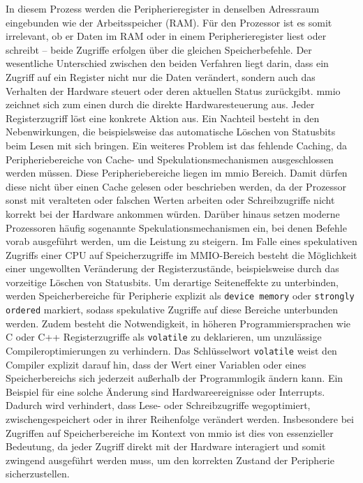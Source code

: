 In diesem Prozess werden die Peripherieregister in denselben Adressraum eingebunden wie der Arbeitsspeicher (RAM). 
Für den Prozessor ist es somit irrelevant, ob er Daten im RAM oder in einem Peripherieregister liest oder schreibt – beide Zugriffe erfolgen über die gleichen Speicherbefehle. 
Der wesentliche Unterschied zwischen den beiden Verfahren liegt darin, dass ein Zugriff auf ein Register nicht nur die Daten verändert, sondern auch das Verhalten der Hardware steuert oder deren aktuellen Status zurückgibt.
\gls{mmio} zeichnet sich zum einen durch die direkte Hardwaresteuerung aus.
Jeder Registerzugriff löst eine konkrete Aktion aus.
Ein Nachteil besteht in den Nebenwirkungen, die beispielsweise das automatische Löschen von Statusbits beim Lesen mit sich bringen.
Ein weiteres Problem ist das fehlende Caching, da Peripheriebereiche von Cache- und Spekulationsmechanismen ausgeschlossen werden müssen. 
Diese Peripheriebereiche liegen im \gls{mmio} Bereich.
Damit dürfen diese nicht über einen Cache gelesen oder beschrieben werden, da der Prozessor sonst mit veralteten oder falschen Werten arbeiten oder Schreibzugriffe nicht korrekt bei der Hardware ankommen würden.
Darüber hinaus setzen moderne Prozessoren häufig sogenannte Spekulationsmechanismen ein, bei denen Befehle vorab ausgeführt werden, um die Leistung zu steigern.
Im Falle eines spekulativen Zugriffs einer CPU auf Speicherzugriffe im MMIO-Bereich besteht die Möglichkeit einer ungewollten Veränderung der Registerzustände, beispielsweise durch das vorzeitige Löschen von Statusbits.
Um derartige Seiteneffekte zu unterbinden, werden Speicherbereiche für Peripherie explizit als \texttt{device memory} oder \texttt{strongly ordered} markiert, sodass spekulative Zugriffe auf diese Bereiche unterbunden werden.
Zudem besteht die Notwendigkeit, in höheren Programmiersprachen wie C oder C++ Registerzugriffe als \texttt{volatile} zu deklarieren, um unzulässige Compileroptimierungen zu verhindern.
Das Schlüsselwort \texttt{volatile} weist den Compiler explizit darauf hin, dass der Wert einer Variablen oder eines Speicherbereichs sich jederzeit außerhalb der Programmlogik ändern kann. Ein Beispiel für eine solche Änderung sind Hardwareereignisse oder Interrupts.
Dadurch wird verhindert, dass Lese- oder Schreibzugriffe wegoptimiert, zwischengespeichert oder in ihrer Reihenfolge verändert werden.
Insbesondere bei Zugriffen auf Speicherbereiche im Kontext von \gls{mmio} ist dies von essenzieller Bedeutung, da jeder Zugriff direkt mit der Hardware interagiert und somit zwingend ausgeführt werden muss, um den korrekten Zustand der Peripherie sicherzustellen.


